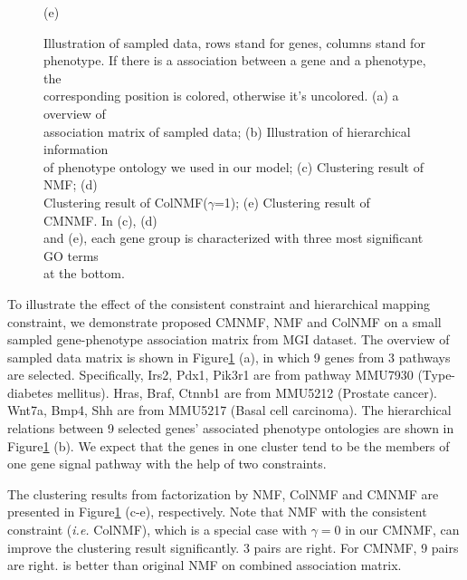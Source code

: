 \documentclass{bmcart}
\begin{document}
\begin{figure}[!h]
\begin{minipage}{.3\linewidth}
    \centerline{(e)}
  \end{minipage}
  \caption{Illustration of sampled data, rows stand for genes, columns stand for \protect\\
  phenotype. If there is a association between a gene and a phenotype, the \protect \\
  corresponding position is colored, otherwise it's uncolored. (a) a overview of \protect \\
  association matrix of sampled data; (b) Illustration of hierarchical information \protect \\
  of phenotype ontology we used in our model; (c) Clustering result of NMF; (d)\protect \\
  Clustering result of ColNMF($\gamma$=1); (e) Clustering result of CMNMF. In (c), (d) \protect \\
  and (e), each gene group is characterized with three most significant GO terms\protect \\
   at the bottom.
   }
  \label{fig:sampled_result}
\end{figure}
To illustrate the effect of the consistent constraint and hierarchical mapping constraint, we demonstrate proposed CMNMF, NMF and ColNMF on a small sampled gene-phenotype association matrix from MGI dataset. The overview of sampled data matrix is shown in Figure\ref{fig:sampled_result} (a), in which 9 genes from 3 pathways are selected. Specifically, Irs2, Pdx1, Pik3r1 are from pathway MMU7930 (Type-\uppercase\expandafter{} diabetes mellitus). Hras, Braf, Ctnnb1 are from MMU5212 (Prostate cancer). Wnt7a, Bmp4, Shh are from MMU5217 (Basal cell carcinoma). The hierarchical relations between 9 selected genes' associated phenotype ontologies are shown in Figure\ref{fig:sampled_result} (b). We expect that the genes in one cluster tend to be the members of one gene signal pathway with the help of two constraints.

The clustering results from factorization by NMF, ColNMF and CMNMF are presented in Figure\ref{fig:sampled_result} (c-e), respectively. Note that NMF with the consistent constraint (\emph{i.e.} ColNMF), which is a special case with $\gamma=0$ in our CMNMF, can improve the clustering result significantly. 3 pairs are right. For CMNMF, 9 pairs are right. is better than original NMF on combined association matrix.
\end{document}
